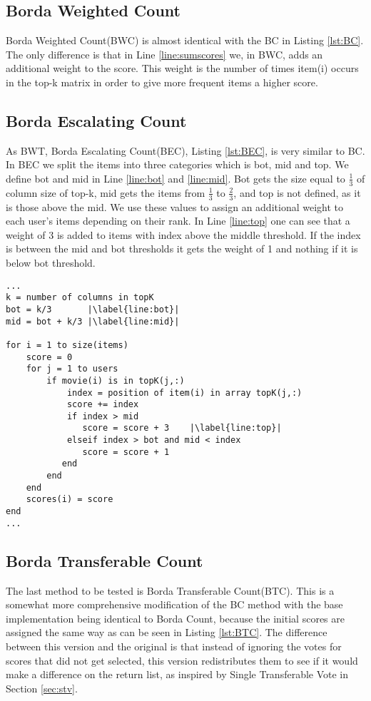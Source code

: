 \subsection{Borda Weighted Count}
Borda Weighted Count(BWC) is almost identical with the BC in Listing \ref{lst:BC}. The only difference is that in Line \ref{line:sumscores} we, in BWC, adds an additional weight to the score. This weight is the number of times item(i) occurs in the top-k matrix in order to give more frequent items a higher score.

\subsection{Borda Escalating Count}
As BWT, Borda Escalating Count(BEC), Listing \ref{lst:BEC}, is very similar to BC. In BEC we split the items into three categories which is bot, mid and top. We define bot and mid in Line \ref{line:bot} and \ref{line:mid}. Bot gets the size equal to $\frac{1}{3}$ of column size of top-k, mid gets the items from $\frac{1}{3}$ to $\frac{2}{3}$, and top is not defined, as it is those above the mid. We use these values to assign an additional weight to each user's items depending on their rank. In Line \ref{line:top} one can see that a weight of 3 is added to items with index above the middle threshold. If the index is between the mid and bot thresholds it gets the weight of 1 and nothing if it is below bot threshold.
\begin{lstlisting}[caption={Borda escalating count implementation},label=lst:BEC, firstnumber=7,escapechar=|]
...
k = number of columns in topK
bot = k/3 		|\label{line:bot}|
mid = bot + k/3	|\label{line:mid}|

for i = 1 to size(items)
	score = 0
	for j = 1 to users
		if movie(i) is in topK(j,:)
			index = position of item(i) in array topK(j,:)
			score += index
			if index > mid			
               score = score + 3	|\label{line:top}|
           	elseif index > bot and mid < index
               score = score + 1
           end 
		end
	end
	scores(i) = score
end
...
\end{lstlisting}

\subsection{Borda Transferable Count} \label{sec:BTC}
The last method to be tested is Borda Transferable Count(BTC). This is a somewhat more comprehensive modification of the BC method with the base implementation being identical to Borda Count, because the initial scores are assigned the same way as can be seen in Listing \ref{lst:BTC}. The difference between this version and the original is that instead of ignoring the votes for scores that did not get selected, this version redistributes them to see if it would make a difference on the return list, as inspired by Single Transferable Vote in Section \ref{sec:stv}.


